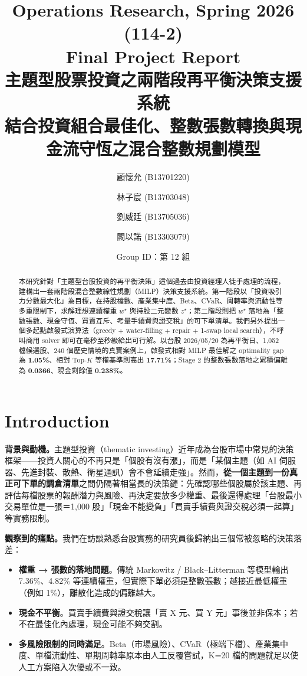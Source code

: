 \documentclass[11pt,a4paper]{article}
\title{Operations Research, Spring 2026 (114-2) \\
Final Project Report \\[4pt]
\large 主題型股票投資之兩階段再平衡決策支援系統 \\
\normalsize 結合投資組合最佳化、整數張數轉換與現金流守恆之混合整數規劃模型}
\author{顧懷允 (B13701220)}
\author{林子宸 (B13703048)}
\author{劉威廷 (B13705036)}
\author{闕以諾 (B13303079)}
\affil{Department of Information Management, National Taiwan University}
\date{Group ID：第 12 組}
\newenvironment{itemizeTight}{\begin{itemize}\vspace{-8pt}}{\end{itemize}\vspace{-8pt}}
\begin{document}
\maketitle

\begin{abstract}
\noindent 本研究針對「主題型台股投資的再平衡決策」這個過去由投資經理人徒手處理的流程，建構出一套兩階段混合整數線性規劃（MILP）決策支援系統。第一階段以「投資吸引力分數最大化」為目標，在持股檔數、產業集中度、Beta、CVaR、周轉率與流動性等多重限制下，求解理想連續權重 $w^\star$ 與持股二元變數 $z^\star$；第二階段則把 $w^\star$ 落地為「整數張數、現金守恆、買賣互斥、考量手續費與證交稅」的可下單清單。我們另外提出一個多起點啟發式演算法（greedy + water-filling + repair + 1-swap local search），不呼叫商用 solver 即可在毫秒至秒級給出可行解。以台股 2026/05/20 為再平衡日、1{,}052 檔候選股、240 個歷史情境的真實案例上，啟發式相對 MILP 最佳解之 optimality gap 為 \textbf{1.05\%}、相對 Top-$K$ 等權基準則高出 \textbf{17.71\%}；Stage 2 的整數張數落地之累積偏離為 \textbf{0.0366}、現金剩餘僅 \textbf{0.238\%}。
\end{abstract}



\section{Introduction}
\label{sec-intro}

\textbf{背景與動機。}{}主題型投資（thematic investing）近年成為台股市場中常見的決策框架——投資人關心的不再只是「個股有沒有漲」，而是「某個主題（如 AI 伺服器、先進封裝、散熱、衛星通訊）會不會延續走強」。然而，\textbf{從一個主題到一份真正可下單的調倉清單}之間仍隔著相當長的決策鏈：先確認哪些個股屬於該主題、再評估每檔股票的報酬潛力與風險、再決定要放多少權重、最後還得處理「台股最小交易單位是一張＝1{,}000 股」「現金不能變負」「買賣手續費與證交稅必須一起算」等實務限制。

\textbf{觀察到的痛點。}{}我們在訪談熟悉台股實務的研究員後歸納出三個常被忽略的決策落差：
\begin{itemizeTight}
    \item \textbf{權重 → 張數的落地問題}。傳統 Markowitz / Black–Litterman 等模型輸出 7.36\%、4.82\% 等連續權重，但實際下單必須是整數張數；越接近最低權重（例如 1\%），離散化造成的偏離越大。
    \item \textbf{現金不平衡}。買賣手續費與證交稅讓「賣 X 元、買 Y 元」事後並非保本；若不在最佳化內處理，現金可能不夠交割。
    \item \textbf{多風險限制的同時滿足}。Beta（市場風險）、CVaR（極端下檔）、產業集中度、單檔流動性、單期周轉率原本由人工反覆嘗試，K=20 檔的問題就足以使人工方案陷入次優或不一致。
\end{itemizeTight}
\end{document}
